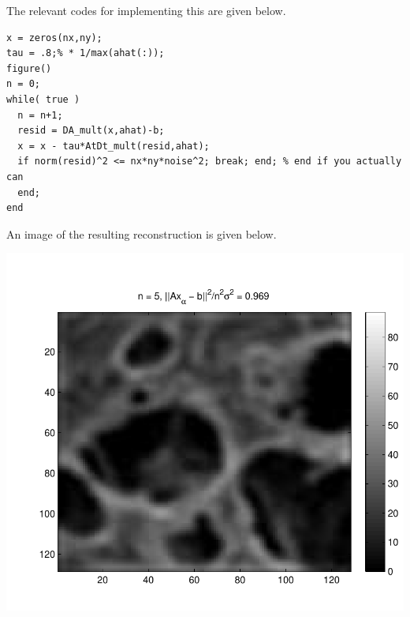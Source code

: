 \documentclass{homework}
\begin{document}
\begin{solution}
  The relevant codes for implementing this are given below.
{\small
\begin{lstlisting}
x = zeros(nx,ny);
tau = .8;% * 1/max(ahat(:));
figure()
n = 0;
while( true )
  n = n+1;
  resid = DA_mult(x,ahat)-b;
  x = x - tau*AtDt_mult(resid,ahat);
  if norm(resid)^2 <= nx*ny*noise^2; break; end; % end if you actually can
  end;
end
\end{lstlisting}




An image of the resulting reconstruction is given below.
\begin{center}
  \includegraphics[width=.6\textwidth]{data_driven.pdf}
\end{center}
}
\end{solution}
\end{document}
